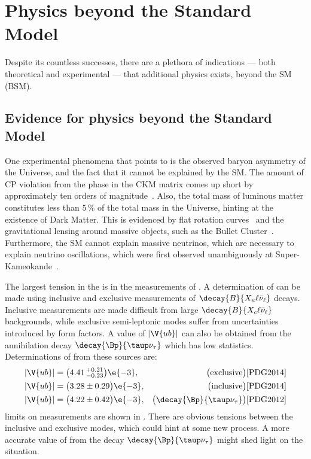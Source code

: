 \section{Physics beyond the Standard Model}

Despite its countless successes, there are a plethora of indications --- both
theoretical and experimental --- that additional physics exists, beyond the SM (BSM).

\subsection{Evidence for physics beyond the Standard Model}
One experimental phenomena that points to \np is the observed baryon asymmetry of the Universe, and
the fact that it cannot be explained by the SM.
The amount of CP violation from the phase in the CKM matrix comes up short by approximately ten
orders of magnitude~\cite{Cline:2006ts,Huet:1994jb}.
Also, the total mass of luminous matter constitutes less than $5\,\%$ of the
total mass in the Universe, hinting at the existence of Dark Matter.
This is evidenced by flat rotation
curves~\cite{1970ApJ...159..379R,1980ApJ...238..471R} and the gravitational lensing around massive
objects, such as the Bullet Cluster~\cite{Markevitch:2003at}.
Furthermore, the SM cannot explain massive neutrinos, which are necessary to explain neutrino
oscillations, which were first observed unambiguously at
Super-Kameokande~\cite{PhysRevLett.81.1562}.



The largest tension in the \ut is in  the measurements of .
A determination of  can be made using inclusive and exclusive measurements of
$\decay{B}{X_u\ell\bar\nu_\ell}$ decays.
Inclusive measurements are made difficult from large
$\decay{B}{X_c\ell\bar\nu_\ell}$ backgrounds, while exclusive semi-leptonic modes suffer from
uncertainties introduced by form factors.
A value of $\left|\V{ub}\right|$ can also be obtained from the annihilation decay
$\decay{\Bp}{\taup\nu_\tau}$ which has low statistics.
Determinations of  from these sources are:
\begin{align}
  |\V{ub}| &= \big(4.41\,^{+0.21}_{-0.23}\big)\e{-3}, & \quad\big(\mathrm{exclusive}\big)\text{\cite{PDG2014}}& \nonumber\\
  |\V{ub}| &= \big(3.28\pm{0.29}\big)\e{-3},  & \big(\mathrm{inclusive}\big)\text{\cite{PDG2014}}&\nonumber\\
  |\V{ub}| &= \big(4.22\pm{0.42}\big)\e{-3},  & \big(\decay{\Bp}{\taup\nu_\tau}\big)\text{\cite{PDG2012}}&\nonumber\\
\end{align}
limits on \ut measurements are shown in .
There are obvious tensions between the inclusive and exclusive modes, which could hint at some new
process.
A more accurate value of  from the decay $\decay{\Bp}{\taup\nu_\tau}$ might shed light on the
situation.



